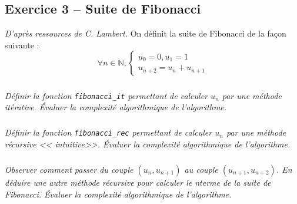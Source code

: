 \else
\fi
 
\subsection*{Exercice 3 -- Suite de Fibonacci}
\setcounter{subparagraph}{0}

\ifprof
\else
\textit{D'après ressources de C. Lambert.}
On définit la suite de Fibonacci de la façon suivante : 
$$
\forall n\in \mathbb{N}, \left\{ \begin{array}{l}
u_0 = 0, u_1 = 1 \\
u_{n+2} = u_{n} + u_{n+1}
\end{array}\right.
$$
\subparagraph{}
\textit{Définir la fonction \texttt{fibonacci\_it} permettant de calculer $u_n$ par une méthode itérative. Évaluer la 
complexité algorithmique de l'algorithme.}

\subparagraph{}
\textit{Définir la fonction \texttt{fibonacci\_rec} permettant de calculer $u_n$ par une méthode récursive << 
intuitive>>. Évaluer la complexité algorithmique de l'algorithme.}


\subparagraph{}
\textit{Observer comment passer du couple $(u_n,u_{n+1})$ au couple $(u_{n+1},u_{n+2})$. En déduire une autre méthode 
récursive pour calculer le n\ieme terme de la suite de Fibonacci. Évaluer la complexité algorithmique de l'algorithme.}
\fi


